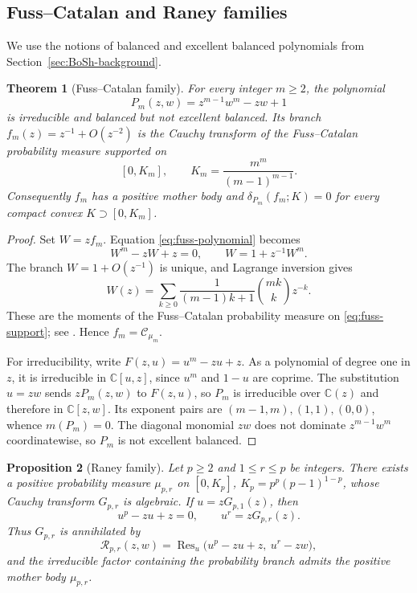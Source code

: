 \documentclass[10pt,a4paper]{amsart}
\newtheorem{theorem}{Theorem}[section]
\newtheorem{proposition}[theorem]{Proposition}
\newcommand{\bC}{\mathbb C}
\newcommand{\Cauchy}{\mathcal C}
\begin{document}
\subsection{Fuss--Catalan and Raney families}

We use the notions of balanced and excellent balanced polynomials from
Section~\ref{sec:BoSh-background}.

\begin{theorem}[Fuss--Catalan family]\label{thm:fuss-catalan}
For every integer $m\ge2$, the polynomial
\begin{equation}\label{eq:fuss-polynomial}
 P_m(z,w)=z^{m-1}w^m-zw+1
\end{equation}
is irreducible and balanced but not excellent balanced.  Its branch
$f_m(z)=z^{-1}+O(z^{-2})$ is the Cauchy transform of the Fuss--Catalan
probability measure supported on
\begin{equation}\label{eq:fuss-support}
 [0,K_m],\qquad K_m=\frac{m^m}{(m-1)^{m-1}}.
\end{equation}
Consequently $f_m$ has a positive mother body and
$\delta_{P_m}(f_m;K)=0$ for every compact convex $K\supset[0,K_m]$.
\end{theorem}

\begin{proof}
Set $W=zf_m$.  Equation \eqref{eq:fuss-polynomial} becomes
\[
 W^m-zW+z=0,
 \qquad W=1+z^{-1}W^m.
\]
The branch $W=1+O(z^{-1})$ is unique, and Lagrange inversion gives
\[
 W(z)=\sum_{k\ge0}\frac{1}{(m-1)k+1}\binom{mk}{k}z^{-k}.
\]
These are the moments of the Fuss--Catalan probability measure on
\eqref{eq:fuss-support}; see \cite[(2.1), (2.7), and (2.10)]{ForresterLiu}.
Hence $f_m=\Cauchy_{\mu_m}$.

For irreducibility, write $F(z,u)=u^m-zu+z$.  As a polynomial of degree one in
$z$, it is irreducible in $\bC[u,z]$, since $u^m$ and $1-u$ are coprime.  The
substitution $u=zw$ sends $zP_m(z,w)$ to $F(z,u)$, so $P_m$ is irreducible over
$\bC(z)$ and therefore in $\bC[z,w]$.  Its exponent pairs are
$(m-1,m),(1,1),(0,0)$, whence $m(P_m)=0$.  The diagonal monomial $zw$ does not
dominate $z^{m-1}w^m$ coordinatewise, so $P_m$ is not excellent balanced.
\end{proof}

\begin{proposition}[Raney family]\label{prop:raney}
Let $p\ge2$ and $1\le r\le p$ be integers.  There exists a positive probability
measure $\mu_{p,r}$ on
$[0,K_p]$, $K_p=p^p(p-1)^{1-p}$, whose Cauchy transform $G_{p,r}$ is algebraic.
If $u=zG_{p,1}(z)$, then
\begin{equation}\label{eq:raney-relations}
 u^p-zu+z=0,\qquad u^r=zG_{p,r}(z).
\end{equation}
Thus $G_{p,r}$ is annihilated by
\begin{equation}\label{eq:raney-resultant}
 \mathcal R_{p,r}(z,w)=
 \operatorname{Res}_u\bigl(u^p-zu+z,\ u^r-zw\bigr),
\end{equation}
and the irreducible factor containing the probability branch admits the positive
mother body $\mu_{p,r}$.
\end{proposition}
\end{document}
